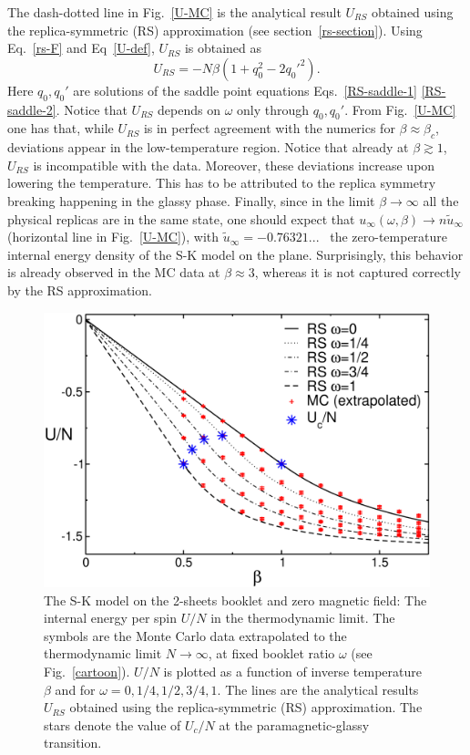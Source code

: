 \documentclass[twocolumn,superscriptaddress,prb,10pt]{revtex4-1}
\begin{document}
The dash-dotted line in Fig.~\ref{U-MC} is the analytical result $U_{RS}$ obtained using 
the replica-symmetric (RS) approximation (see section~\ref{rs-section}). 
Using Eq.~\eqref{rs-F} and Eq~\eqref{U-def}, $U_{RS}$  is obtained as   
%
\begin{equation}
U_{RS}=-N\beta(1+q_0^2-2q_0'^2). 
\label{U}
\end{equation}
% 
Here $q_0,q_0'$ are solutions of the saddle point equations Eqs.~\eqref{RS-saddle-1}
\eqref{RS-saddle-2}. Notice that $U_{RS}$ depends on $\omega$ only through $q_0,q_0'$. 
From Fig.~\ref{U-MC} one has that, while $U_{RS}$ is in perfect agreement with the 
numerics for $\beta\approx\beta_c$, deviations appear in the low-temperature region. 
Notice that already at $\beta\gtrsim 1$, $U_{RS}$ is incompatible with the data. 
Moreover, these deviations increase upon lowering the temperature. This has to be 
attributed to the replica symmetry breaking happening in the glassy phase. 
Finally, since in the limit $\beta\to\infty$ all the physical replicas are in the same state, 
one should expect that $u_\infty(\omega,\beta)\to n \tilde u_\infty$ (horizontal line in 
Fig.~\ref{U-MC}), with $\tilde u_{\infty}=-0.76321...$~\cite{parisi-1979,parisi-1983} the 
zero-temperature internal energy density of the S-K model on the plane. Surprisingly, 
this behavior is already observed in the MC data at $\beta\approx 3$, whereas it is not 
captured correctly by the RS approximation.


\begin{figure}[t]
\includegraphics*[width=0.93\linewidth]{./draft_figs/U_extrapolated}
\caption{
 The S-K model on the 2-sheets booklet and zero magnetic field: 
 The internal energy per spin $U/N$ in the thermodynamic limit. 
 The symbols are the Monte Carlo data extrapolated to the thermodynamic 
 limit $N\to\infty$, at fixed booklet ratio $\omega$ (see Fig.~\ref{cartoon}).  
 $U/N$ is plotted as a function of inverse temperature $\beta$ and for 
 $\omega=0,1/4,1/2,3/4,1$. The lines are the analytical results $U_{RS}$ 
 obtained using the replica-symmetric (RS) approximation. The stars denote 
 the value of $U_c/N$ at the paramagnetic-glassy transition. 
}
\label{U-RS}
\end{figure}
\end{document}
